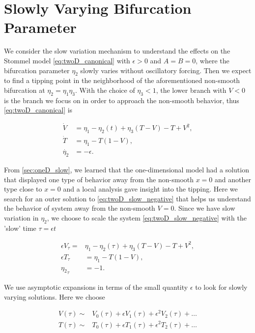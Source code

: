 \section{Slowly Varying Bifurcation Parameter}
\label{sec:twoD_slow}

We consider the slow variation mechanism to understand the effects on the Stommel model \eqref{eq:twoD_canonical} with $\epsilon>0$ and $A=B=0$, where the bifurcation parameter $\eta_2$ slowly varies without oscillatory forcing. Then we expect to find a tipping point in the neighborhood of the aforementioned non-smooth bifurcation at $\eta_2=\eta_1\eta_3$. With the choice of $\eta_3<1$, the lower branch with $V<0$ is the branch we focus on in order to approach the non-smooth behavior, thus \eqref{eq:twoD_canonical} is

\begin{equation}\label{eq:twoD_slow_negative}
 \begin{aligned}
  \dot{V} & = \eta_1-\eta_2(t)+\eta_3(T-V)-T+V^2, \\
  \dot{T} & = \eta_1-T(1-V), \\
 \dot{\eta_2} & = -\epsilon.
 \end{aligned}
\end{equation}

From \autoref{sec:oneD_slow}, we learned that the one-dimensional model had a solution that displayed one type of behavior away from the non-smooth $x=0$ and another type close to $x=0$ and a local analysis gave insight into the tipping. Here we search for an outer solution to \eqref{eq:twoD_slow_negative} that helps us understand the behavior of system away from the non-smooth $V=0$. Since we have slow variation in $\eta_2$, we choose to scale the system \eqref{eq:twoD_slow_negative} with the 'slow' time $\tau=\epsilon t$

\begin{equation}\label{eq:twoD_slow_slowsystem}
\begin{aligned}
\epsilon V_\tau =&\eta_1-\eta_2(\tau)+\eta_3(T-V)-T+V^2, \\
\epsilon T_\tau & = \eta_1-T(1-V), \\
 {\eta_2}_\tau & = -1.
\end{aligned}
\end{equation}

We use asymptotic expansions in terms of the small quantity $\epsilon$ to look for slowly varying solutions. Here we choose

\begin{equation}\label{eq:twoD_slow_outerexpansion}
\begin{aligned}
V(\tau)\sim &V_0(\tau)+\epsilon V_1(\tau)+\epsilon^2 V_2(\tau)+\ldots\\
T(\tau)\sim & T_0(\tau)+\epsilon T_1(\tau)+\epsilon^2 T_2(\tau)+\ldots
\end{aligned}
\end{equation}

